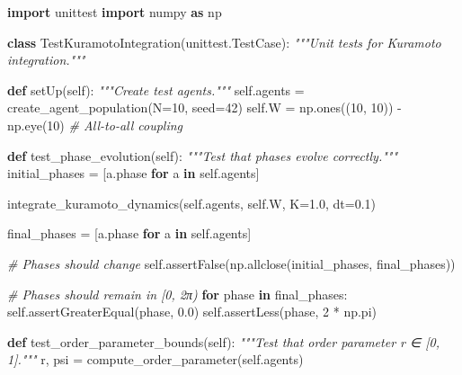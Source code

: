\documentclass[
]{article}
\newenvironment{Shaded}{}{}
\newcommand{\CommentTok}[1]{\textcolor[rgb]{0.38,0.63,0.69}{\textit{#1}}}
\newcommand{\ControlFlowTok}[1]{\textcolor[rgb]{0.00,0.44,0.13}{\textbf{#1}}}
\newcommand{\DecValTok}[1]{\textcolor[rgb]{0.25,0.63,0.44}{#1}}
\newcommand{\FloatTok}[1]{\textcolor[rgb]{0.25,0.63,0.44}{#1}}
\newcommand{\ImportTok}[1]{\textcolor[rgb]{0.00,0.50,0.00}{\textbf{#1}}}
\newcommand{\KeywordTok}[1]{\textcolor[rgb]{0.00,0.44,0.13}{\textbf{#1}}}
\newcommand{\NormalTok}[1]{#1}
\newcommand{\OperatorTok}[1]{\textcolor[rgb]{0.40,0.40,0.40}{#1}}
\newcommand{\VariableTok}[1]{\textcolor[rgb]{0.10,0.09,0.49}{#1}}
\begin{document}
\begin{Shaded}
\begin{Highlighting}[]
\ImportTok{import}\NormalTok{ unittest}
\ImportTok{import}\NormalTok{ numpy }\ImportTok{as}\NormalTok{ np}

\KeywordTok{class}\NormalTok{ TestKuramotoIntegration(unittest.TestCase):}
    \CommentTok{"""Unit tests for Kuramoto integration."""}

    \KeywordTok{def}\NormalTok{ setUp(}\VariableTok{self}\NormalTok{):}
        \CommentTok{"""Create test agents."""}
        \VariableTok{self}\NormalTok{.agents }\OperatorTok{=}\NormalTok{ create\_agent\_population(N}\OperatorTok{=}\DecValTok{10}\NormalTok{, seed}\OperatorTok{=}\DecValTok{42}\NormalTok{)}
        \VariableTok{self}\NormalTok{.W }\OperatorTok{=}\NormalTok{ np.ones((}\DecValTok{10}\NormalTok{, }\DecValTok{10}\NormalTok{)) }\OperatorTok{{-}}\NormalTok{ np.eye(}\DecValTok{10}\NormalTok{)  }\CommentTok{\# All{-}to{-}all coupling}

    \KeywordTok{def}\NormalTok{ test\_phase\_evolution(}\VariableTok{self}\NormalTok{):}
        \CommentTok{"""Test that phases evolve correctly."""}
\NormalTok{        initial\_phases }\OperatorTok{=}\NormalTok{ [a.phase }\ControlFlowTok{for}\NormalTok{ a }\KeywordTok{in} \VariableTok{self}\NormalTok{.agents]}

\NormalTok{        integrate\_kuramoto\_dynamics(}\VariableTok{self}\NormalTok{.agents, }\VariableTok{self}\NormalTok{.W, K}\OperatorTok{=}\FloatTok{1.0}\NormalTok{, dt}\OperatorTok{=}\FloatTok{0.1}\NormalTok{)}

\NormalTok{        final\_phases }\OperatorTok{=}\NormalTok{ [a.phase }\ControlFlowTok{for}\NormalTok{ a }\KeywordTok{in} \VariableTok{self}\NormalTok{.agents]}

        \CommentTok{\# Phases should change}
        \VariableTok{self}\NormalTok{.assertFalse(np.allclose(initial\_phases, final\_phases))}

        \CommentTok{\# Phases should remain in [0, 2π)}
        \ControlFlowTok{for}\NormalTok{ phase }\KeywordTok{in}\NormalTok{ final\_phases:}
            \VariableTok{self}\NormalTok{.assertGreaterEqual(phase, }\FloatTok{0.0}\NormalTok{)}
            \VariableTok{self}\NormalTok{.assertLess(phase, }\DecValTok{2} \OperatorTok{*}\NormalTok{ np.pi)}

    \KeywordTok{def}\NormalTok{ test\_order\_parameter\_bounds(}\VariableTok{self}\NormalTok{):}
        \CommentTok{"""Test that order parameter r ∈ [0, 1]."""}
\NormalTok{        r, psi }\OperatorTok{=}\NormalTok{ compute\_order\_parameter(}\VariableTok{self}\NormalTok{.agents)}


\end{Highlighting}
\end{Shaded}
\end{document}
